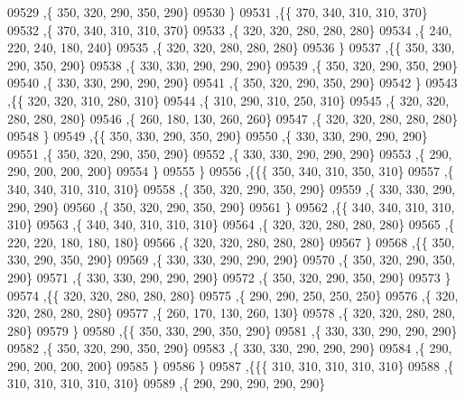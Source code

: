\begin{DoxyCode}
09529     ,\{   350,   320,   290,   350,   290\}
09530     \}
09531    ,\{\{   370,   340,   310,   310,   370\}
09532     ,\{   370,   340,   310,   310,   370\}
09533     ,\{   320,   320,   280,   280,   280\}
09534     ,\{   240,   220,   240,   180,   240\}
09535     ,\{   320,   320,   280,   280,   280\}
09536     \}
09537    ,\{\{   350,   330,   290,   350,   290\}
09538     ,\{   330,   330,   290,   290,   290\}
09539     ,\{   350,   320,   290,   350,   290\}
09540     ,\{   330,   330,   290,   290,   290\}
09541     ,\{   350,   320,   290,   350,   290\}
09542     \}
09543    ,\{\{   320,   320,   310,   280,   310\}
09544     ,\{   310,   290,   310,   250,   310\}
09545     ,\{   320,   320,   280,   280,   280\}
09546     ,\{   260,   180,   130,   260,   260\}
09547     ,\{   320,   320,   280,   280,   280\}
09548     \}
09549    ,\{\{   350,   330,   290,   350,   290\}
09550     ,\{   330,   330,   290,   290,   290\}
09551     ,\{   350,   320,   290,   350,   290\}
09552     ,\{   330,   330,   290,   290,   290\}
09553     ,\{   290,   290,   200,   200,   200\}
09554     \}
09555    \}
09556   ,\{\{\{   350,   340,   310,   350,   310\}
09557     ,\{   340,   340,   310,   310,   310\}
09558     ,\{   350,   320,   290,   350,   290\}
09559     ,\{   330,   330,   290,   290,   290\}
09560     ,\{   350,   320,   290,   350,   290\}
09561     \}
09562    ,\{\{   340,   340,   310,   310,   310\}
09563     ,\{   340,   340,   310,   310,   310\}
09564     ,\{   320,   320,   280,   280,   280\}
09565     ,\{   220,   220,   180,   180,   180\}
09566     ,\{   320,   320,   280,   280,   280\}
09567     \}
09568    ,\{\{   350,   330,   290,   350,   290\}
09569     ,\{   330,   330,   290,   290,   290\}
09570     ,\{   350,   320,   290,   350,   290\}
09571     ,\{   330,   330,   290,   290,   290\}
09572     ,\{   350,   320,   290,   350,   290\}
09573     \}
09574    ,\{\{   320,   320,   280,   280,   280\}
09575     ,\{   290,   290,   250,   250,   250\}
09576     ,\{   320,   320,   280,   280,   280\}
09577     ,\{   260,   170,   130,   260,   130\}
09578     ,\{   320,   320,   280,   280,   280\}
09579     \}
09580    ,\{\{   350,   330,   290,   350,   290\}
09581     ,\{   330,   330,   290,   290,   290\}
09582     ,\{   350,   320,   290,   350,   290\}
09583     ,\{   330,   330,   290,   290,   290\}
09584     ,\{   290,   290,   200,   200,   200\}
09585     \}
09586    \}
09587   ,\{\{\{   310,   310,   310,   310,   310\}
09588     ,\{   310,   310,   310,   310,   310\}
09589     ,\{   290,   290,   290,   290,   290\}

\end{DoxyCode}
